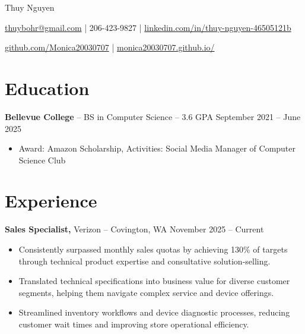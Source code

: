 \documentclass[11pt]{article}       %
\begin{document}
\centerline{\Huge Thuy Nguyen}

\vspace{5pt}

\centerline{\href{mailto:thuybohr@gmail.com}{thuybohr@gmail.com} | 206-423-9827 |
\href{https://www.linkedin.com/in/thuy-nguyen-46505121b/}{linkedin.com/in/thuy-nguyen-46505121b}}

\centerline{\href{https://github.com/Monica20030707}{github.com/Monica20030707} | 
\href{https://monica20030707.github.io/}{monica20030707.github.io/}} 

\vspace{-9pt}

\section*{Education}
\textbf{Bellevue College} -- BS in Computer Science -- 3.6 GPA \hfill September 2021 -- June 2025\\
\vspace{-9pt}
\begin{itemize}
  \item Award: Amazon Scholarship, Activities: Social Media Manager of Computer Science Club
\end{itemize}

\vspace{-18.5pt}

\section*{Experience}

\textbf{Sales Specialist,} {Verizon} -- Covington, WA \hfill November 2025 -- Current \\
\vspace{-9pt}
\begin{itemize}
  \item Consistently surpassed monthly sales quotas by achieving 130\% of targets through technical product expertise and consultative solution-selling.
  \item Translated technical specifications into business value for diverse customer segments, helping them navigate complex service and device offerings.
  \item Streamlined inventory workflows and device diagnostic processes, reducing customer wait times and improving store operational efficiency.
\end{itemize}
\end{document}
